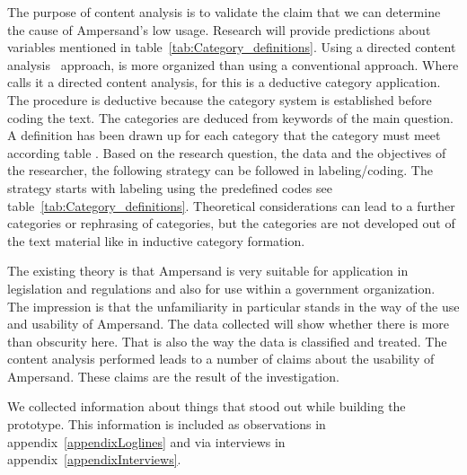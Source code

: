 The purpose of content analysis is to validate the claim that we can determine the cause of Ampersand's low usage.
Research will provide predictions about variables mentioned in table~\ref{tab:Category_definitions}.
Using a directed content analysis~\citep{hsieh_three_2005}  approach, is more organized than using a conventional approach.
Where \cite{hsieh_three_2005} calls it a directed content analysis, for \cite{mayring_qualitative_2019} this is a deductive category application.
The procedure is deductive because the category system is established before coding the text. 
The categories are deduced from keywords of the main question. 
A definition has been drawn up for each category that the category must meet according table .
Based on the research question, the data and the objectives of the researcher, the following strategy can be followed in labeling/coding.
The strategy starts with labeling using the predefined codes see table~\ref{tab:Category_definitions}.
Theoretical considerations can lead to a further categories or rephrasing of categories, but the categories are not developed out of the text material like in inductive category formation.

The existing theory is that Ampersand is very suitable for application in legislation and regulations and also for use within a government organization.
The impression is that the unfamiliarity in particular stands in the way of the use and usability of Ampersand.
The data collected will show whether there is more than obscurity here.
That is also the way the data is classified and treated.
The content analysis performed leads to a number of claims about the usability of Ampersand.
These claims are the result of the investigation.

We collected information about things that stood out while building the prototype.
This information is included as observations in appendix~\ref{appendixLoglines} and via interviews in appendix~\ref{appendixInterviews}.

\begin{comment}
Deductief redeneren is een top-down onderzoeksmethode. Je zoekt op basis van een generalisatie naar specifieke gevallen. Met behulp van deductief onderzoek toets je theorieën en hypothesen. Het proces bestaat over het algemeen uit vier stappen: er is een theorie (generalisering), je formuleert een hypothese, je observeert of analyseert, je bevestigt of verwerpt de hypothese.
\end{comment}

